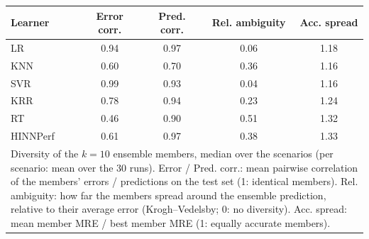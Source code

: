 \footnotesize
\begingroup\setlength{\tabcolsep}{9pt}
\begin{tabular}{lcccc}
\toprule
Learner & Error corr. & Pred. corr. & Rel. ambiguity & Acc. spread \\
\midrule
LR & 0.94 & 0.97 & 0.06 & 1.18 \\
KNN & 0.60 & 0.70 & 0.36 & 1.16 \\
SVR & 0.99 & 0.93 & 0.04 & 1.16 \\
KRR & 0.78 & 0.94 & 0.23 & 1.24 \\
RT & 0.46 & 0.90 & 0.51 & 1.32 \\
HINNPerf & 0.61 & 0.97 & 0.38 & 1.33 \\
\bottomrule
\multicolumn{5}{p{11.5cm}}{\scriptsize Diversity of the $k=10$ ensemble members, median over the scenarios (per scenario: mean over the 30 runs). Error / Pred. corr.: mean pairwise correlation of the members' errors / predictions on the test set (1: identical members). Rel. ambiguity: how far the members spread around the ensemble prediction, relative to their average error (Krogh--Vedelsby; 0: no diversity). Acc. spread: mean member MRE / best member MRE (1: equally accurate members).} \\
\end{tabular}
\endgroup
